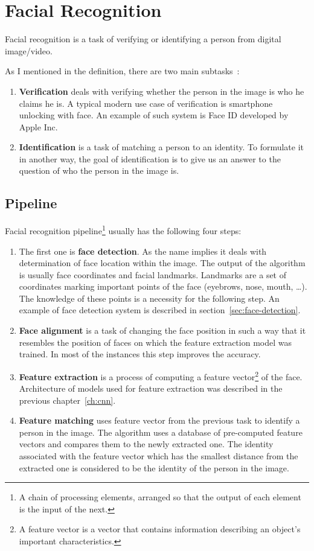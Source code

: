 \chapter{Facial Recognition}\label{ch:face-rec}
Facial recognition is a task of verifying or identifying a person from digital image/video.

As I mentioned in the definition, there are two main subtasks~\cite{FaceRec}:
\begin{enumerate}
    \item \textbf{Verification} deals with verifying whether the person in the image is who he claims he is.
    A typical modern use case of verification is smartphone unlocking with face.
    An example of such system is Face ID developed by Apple Inc.

    \item \textbf{Identification} is a task of matching a person to an identity.
    To formulate it in another way, the goal of identification is to give us an answer to the question of who the person
    in the image is.
\end{enumerate}

\section{Pipeline}\label{sec:pipeline}
Facial recognition pipeline\footnote{\label{foot:pipe}A chain of processing elements, arranged so that the output of
each element is the input of the next.} usually has the following four steps:
\begin{enumerate}
    \item The first one is \textbf{face detection}.
    As the name implies it deals with determination of face location within the image.
    The output of the algorithm is usually face coordinates and facial landmarks.
    Landmarks are a set of coordinates marking important points of the face (eyebrows, nose, mouth, \ldots).
    The knowledge of these points is a necessity for the following step.
    An example of face detection system is described in section~\ref{sec:face-detection}.
    \item \textbf{Face alignment} is a task of changing the face position in such a way that it resembles the position
    of faces on which the feature extraction model was trained.
    In most of the instances this step improves the accuracy.
    \item \textbf{Feature extraction} is a process of computing a feature vector\footnote{A feature vector is a vector
    that contains information describing an object's important characteristics.} of the face.
    Architecture of models used for feature extraction was described in the previous chapter~\ref{ch:cnn}.
    \item \textbf{Feature matching} uses feature vector from the previous task to identify a person in the image.
    The algorithm uses a database of pre-computed feature vectors and compares them to the newly extracted one.
    The identity associated with the feature vector which has the smallest distance from the extracted one is
    considered to be the identity of the person in the image.
\end{enumerate}

